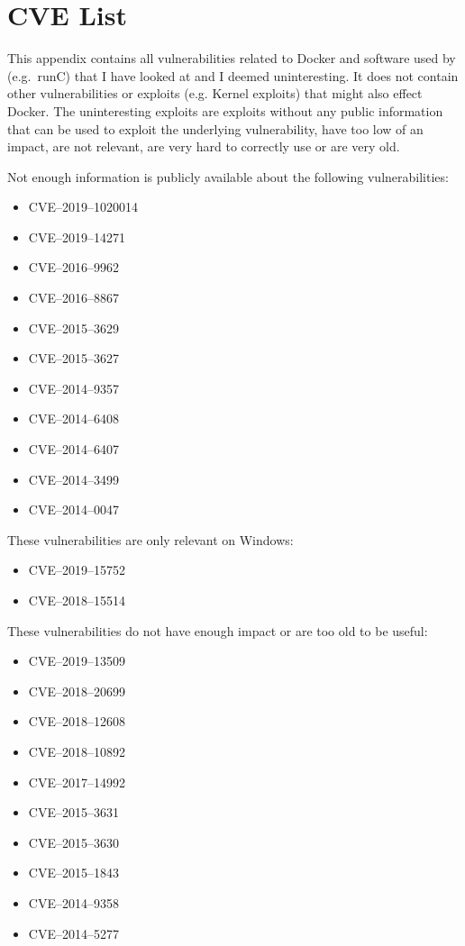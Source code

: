 \chapter{CVE List}\label{appendix:CVE-List}

This appendix contains all vulnerabilities related to Docker and software used by (e.g.\ runC) that I have looked at and I deemed uninteresting. It does not contain other vulnerabilities or exploits (e.g. Kernel exploits) that might also effect Docker. The uninteresting exploits are exploits without any public information that can be used to exploit the underlying vulnerability, have too low of an impact, are not relevant, are very hard to correctly use or are very old.

\hfill

Not enough information is publicly available about the following vulnerabilities:
\begin{multicols}{2}
    \begin{itemize}
        \item CVE--2019--1020014
        \item CVE--2019--14271
        \item CVE--2016--9962
        \item CVE--2016--8867
        \item CVE--2015--3629
        \item CVE--2015--3627
        \item CVE--2014--9357
        \item CVE--2014--6408
        \item CVE--2014--6407
        \item CVE--2014--3499
        \item CVE--2014--0047
    \end{itemize}
\end{multicols}

\hfill

These vulnerabilities are only relevant on Windows:
\begin{itemize}
    \item CVE--2019--15752
    \item CVE--2018--15514
\end{itemize}

\hfill

These vulnerabilities do not have enough impact or are too old to be useful:
\begin{itemize}
    \item CVE--2019--13509
    \item CVE--2018--20699
    \item CVE--2018--12608
    \item CVE--2018--10892
    \item CVE--2017--14992
    \item CVE--2015--3631
    \item CVE--2015--3630
    \item CVE--2015--1843
    \item CVE--2014--9358
    \item CVE--2014--5277
\end{itemize}
